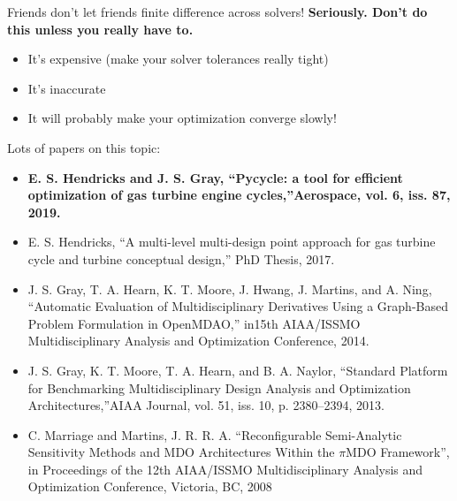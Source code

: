\documentclass[aspectratio=169, usenames,dvipsnames, 14pt]{beamer}
\begin{document}
    
\begin{frame}{Friends don’t let friends finite difference across solvers!}
\textbf{\small Seriously. Don’t do this unless you really have to.}

\begin{itemize}
    \item \small It’s expensive (make your solver tolerances really tight)
    \item \small It’s inaccurate
    \item \small It will probably make your optimization converge slowly!
\end{itemize}

\small Lots of papers on this topic: 

\tiny {
\begin{itemize}
\item \textbf{E. S. Hendricks and J. S. Gray, “Pycycle: a tool for efficient optimization of gas turbine engine cycles,”Aerospace, vol. 6, iss. 87, 2019.}

\item E. S. Hendricks, “A multi-level multi-design point approach for gas turbine cycle and turbine conceptual design,” PhD Thesis, 2017.

\item J. S. Gray, T. A. Hearn, K. T. Moore, J. Hwang, J. Martins, and A. Ning, “Automatic Evaluation of Multidisciplinary Derivatives Using a Graph-Based Problem Formulation in OpenMDAO,” in15th AIAA/ISSMO Multidisciplinary Analysis and Optimization Conference, 2014.

\item J. S. Gray, K. T. Moore, T. A. Hearn, and B. A. Naylor, “Standard Platform for Benchmarking Multidisciplinary Design Analysis and Optimization Architectures,”AIAA Journal, vol. 51, iss. 10, p. 2380–2394, 2013.

\item C. Marriage and Martins, J. R. R. A. “Reconfigurable Semi-Analytic Sensitivity Methods and MDO Architectures Within the $\pi$MDO Framework”, in Proceedings of the 12th AIAA/ISSMO Multidisciplinary Analysis and Optimization Conference, Victoria, BC, 2008
\end{itemize}
}

\end{frame}
\end{document}
